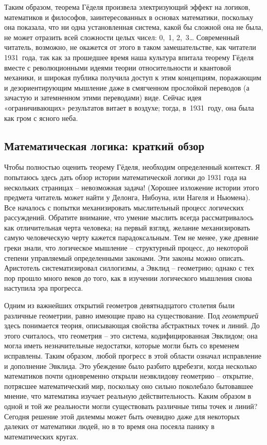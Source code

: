 \documentclass[../main.tex]{subfiles}
\begin{document}
Таким образом, теорема Гёделя произвела электризующий эффект на логиков, математиков и философов, заинтересованных в основах математики, поскольку она показала, что ни одна установленная система, какой бы сложной она не была, не может отразить всей сложности целых чисел: 0,~1, 2,~3\ldots{} Современный читатель, возможно, не окажется от этого в таком замешательстве, как читатели 1931~года, так как за прошедшее время наша культура впитала теорему Гёделя вместе с революционными идеями теории относительности и квантовой механики, и широкая публика получила доступ к этим концепциям, поражающим и дезориентирующим мышление даже в смягченном прослойкой переводов (а зачастую и затемненном этими переводами) виде. Сейчас идея «ограничивающих» результатов витает в воздухе; тогда, в~1931~году, она была как гром с ясного неба.


\subsection{Математическая логика: краткий обзор}

Чтобы полностью оценить теорему Гёделя, необходим определенный контекст. Я попытаюсь здесь дать обзор истории математической логики до 1931 года на нескольких страницах \--- невозможная задача! (Хорошее изложение истории этого предмета читатель может найти у Делонга, Нибоуна, или Нагеля и Ньюмена). Все началось с попытки механизировать мыслительный процесс логических рассуждений. Обратите внимание, что умение мыслить всегда рассматривалось как отличительная черта человека; на первый взгляд, желание механизировать самую человеческую черту кажется парадоксальным. Тем не менее, уже древние греки знали, что логическое мышление \--- структурный процесс, до некоторой степени управляемый определенными законами. Эти законы можно описать. Аристотель систематизировал силлогизмы, а Эвклид \--- геометрию; однако с тех пор прошло много веков до того, как в изучении логического мышления снова наступила эра прогресса.

Одним из важнейших открытий геометров девятнадцатого столетия были различные геометрии, равно имеющие право на существование. Под \emph{геометрией} здесь понимается теория, описывающая свойства абстрактных точек и линий. До этого считалось, что геометрия \--- это система, кодифицированная Эвклидом; она могла иметь незначительные недостатки, которые могли быть со временем исправлены. Таким образом, любой прогресс в этой области означал исправление и дополнение Эвклида. Это убеждение было разбито вдребезги, когда несколько математиков почти одновременно открыли неэвклидову геометрию \--- открытие, потрясшее математический мир, поскольку оно сильно поколебало бытовавшее мнение, что математика изучает реальную действительность. Каким образом в одной и той же реальности могли существовать различные типы точек и линий? Сегодня решение этой дилеммы может быть очевидно даже для некоторых далеких от математики людей, но в то время она посеяла панику в математических кругах.
\end{document}
